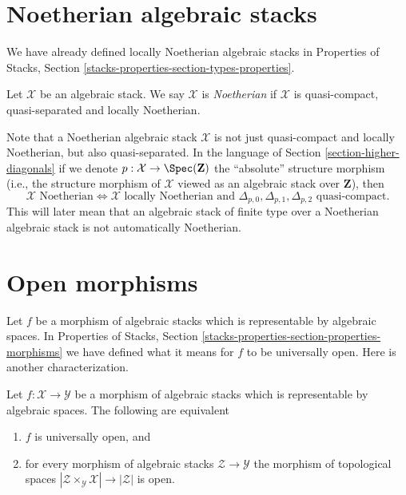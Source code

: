 \section{Noetherian algebraic stacks}
\label{section-noetherian}

\noindent
We have already defined locally Noetherian algebraic stacks in
Properties of Stacks, Section \ref{stacks-properties-section-types-properties}.

\begin{definition}
\label{definition-noetherian}
Let $\mathcal{X}$ be an algebraic stack. We say $\mathcal{X}$ is
{\it Noetherian} if $\mathcal{X}$ is quasi-compact, quasi-separated
and locally Noetherian.
\end{definition}

\noindent
Note that a Noetherian algebraic stack $\mathcal{X}$ is not just quasi-compact
and locally Noetherian, but also quasi-separated. In the language of
Section \ref{section-higher-diagonals}
if we denote $p : \mathcal{X} \to \Spec(\mathbf{Z})$ the
``absolute'' structure morphism (i.e., the structure morphism of
$\mathcal{X}$ viewed as an algebraic stack over $\mathbf{Z}$), then
$$
\mathcal{X}\text{ Noetherian}
\Leftrightarrow
\mathcal{X}\text{ locally Noetherian and }
\Delta_{p, 0}, \Delta_{p, 1}, \Delta_{p, 2}
\text{ quasi-compact}.
$$
This will later mean that an algebraic stack of finite type over a
Noetherian algebraic stack is not automatically Noetherian.










\section{Open morphisms}
\label{section-open}

\noindent
Let $f$ be a morphism of algebraic stacks which is representable by
algebraic spaces. In
Properties of Stacks, Section
\ref{stacks-properties-section-properties-morphisms}
we have defined what it means for $f$ to be universally open.
Here is another characterization.

\begin{lemma}
\label{lemma-characterize-representable-universally-open}
Let $f : \mathcal{X} \to \mathcal{Y}$ be a morphism of
algebraic stacks which is representable by algebraic spaces.
The following are equivalent
\begin{enumerate}
\item $f$ is universally open, and
\item for every morphism of algebraic stacks $\mathcal{Z} \to \mathcal{Y}$
the morphism of topological spaces
$|\mathcal{Z} \times_\mathcal{Y} \mathcal{X}| \to |\mathcal{Z}|$ is open.
\end{enumerate}
\end{lemma}

